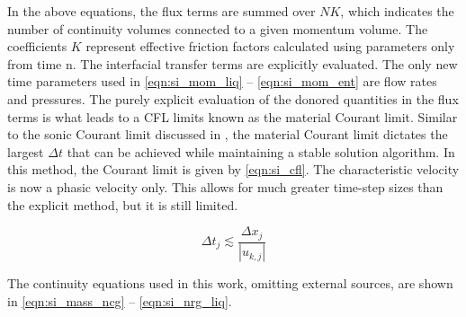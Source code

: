 In the above equations, the flux terms are summed over $NK$, which indicates the number of continuity volumes connected to a given momentum volume.
The coefficients $K$ represent effective friction factors calculated using parameters only from time n.
The interfacial transfer terms are explicitly evaluated.
The only new time parameters used in \eqref{eqn:si_mom_liq} -- \eqref{eqn:si_mom_ent} are flow rates and pressures.
The purely explicit evaluation of the donored quantities in the flux terms is what leads to a CFL limits known as the material Courant limit.
Similar to the sonic Courant limit discussed in , the material Courant limit dictates the largest $\Delta t$ that can be achieved while maintaining a stable solution algorithm.
In this method, the Courant limit is given by \eqref{eqn:si_cfl}.
The characteristic velocity is now a phasic velocity only.
This allows for much greater time-step sizes than the explicit method, but it is still limited.

\begin{equation}
\label{eqn:si_cfl}
\Delta t_j \lesssim \frac{\Delta x_j}{|u_{k,j}|}
\end{equation}

The continuity equations used in this work, omitting external sources, are shown in \eqref{eqn:si_mass_ncg} -- \eqref{eqn:si_nrg_liq}.

